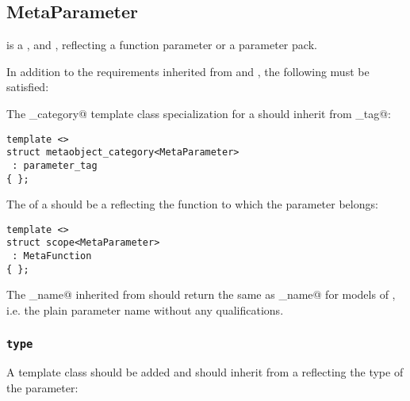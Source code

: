 \subsection{MetaParameter}
\label{concept-MetaParameter}


 is a ,  and ,
reflecting a function parameter or a parameter pack.

In addition to the requirements inherited from  and ,
the following must be satisfied:

The \verb@metaobject_category@ template class specialization for a  should
inherit from \verb@parameter_tag@:

\begin{verbatim}
template <>
struct metaobject_category<MetaParameter>
 : parameter_tag
{ };
\end{verbatim}

The \verb@scope@ of a  should be a  reflecting
the function to which the parameter belongs:

\begin{verbatim}
template <>
struct scope<MetaParameter>
 : MetaFunction
{ };
\end{verbatim}

The \verb@full_name@ inherited from  should return the same 
as \verb@base_name@ for models of , i.e. the plain parameter
name without any qualifications.

\subsubsection{\texttt{type}}

A template class \verb@type@ should be added and should inherit
from a  reflecting the type of the parameter:


